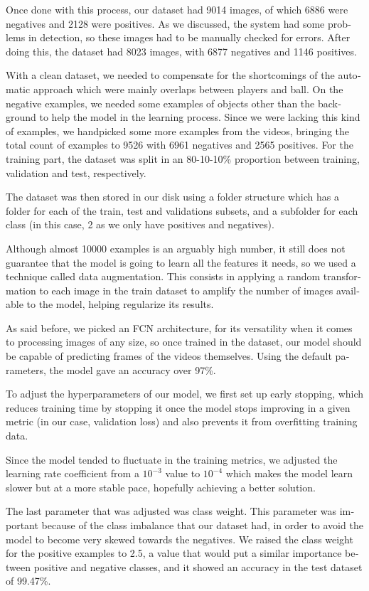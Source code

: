 \begin{otherlanguage}{english}
Once done with this process, our dataset had 9014 images, of which 6886 were negatives and 2128 were positives. As we discussed, the system had some problems in detection, so these images had to be manually checked for errors. After doing this, the dataset had 8023 images, with 6877 negatives and 1146 positives.

With a clean dataset, we needed to compensate for the shortcomings of the automatic approach which were mainly overlaps between players and ball. On the negative examples, we needed some examples of objects other than the background to help the model in the learning process. Since we were lacking this kind of examples, we handpicked some more examples from the videos, bringing the total count of examples to 9526 with 6961 negatives and 2565 positives. For the training part, the dataset was split in an 80-10-10\% proportion between training, validation and test, respectively.

The dataset was then stored in our disk using a folder structure which has a folder for each of the train, test and validations subsets, and a subfolder for each class (in this case, 2 as we only have positives and negatives).

Although almost 10000 examples is an arguably high number, it still does not guarantee that the model is going to learn all the features it needs, so we used a technique called data augmentation. This consists in applying a random transformation to each image in the train dataset to amplify the number of images available to the model, helping regularize its results.

As said before, we picked an FCN architecture, for its versatility when it comes to processing images of any size, so once trained in the dataset, our model should be capable of predicting frames of the videos themselves. Using the default parameters, the model gave an accuracy over 97\%.

To adjust the hyperparameters of our model, we first set up early stopping, which reduces training time by stopping it once the model stops improving in a given metric (in our case, validation loss) and also prevents it from overfitting training data.

Since the model tended to fluctuate in the training metrics, we adjusted the learning rate coefficient from a $10^{-3}$ value to $10^{-4}$ which makes the model learn slower but at a more stable pace, hopefully achieving a better solution.

The last parameter that was adjusted was class weight. This parameter was important because of the class imbalance that our dataset had, in order to avoid the model to become very skewed towards the negatives. We raised the class weight for the positive examples to 2.5, a value that would put a similar importance between positive and negative classes, and it showed an accuracy in the test dataset of 99.47\%.


\end{otherlanguage}
